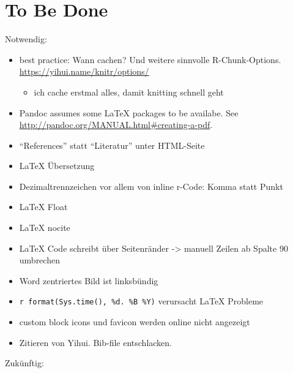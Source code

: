\documentclass[]{book}
\providecommand{\tightlist}{%
  \setlength{\itemsep}{0pt}\setlength{\parskip}{0pt}}
\theoremstyle{definition}
\theoremstyle{definition}
\theoremstyle{remark}
\begin{document}
\hypertarget{tbd}{\chapter{To Be Done}\label{tbd}}

Notwendig:

\begin{itemize}
\tightlist
\item
  best practice: Wann cachen? Und weitere sinnvolle R-Chunk-Options.
  \url{https://yihui.name/knitr/options/}

  \begin{itemize}
  \tightlist
  \item
    ich cache erstmal alles, damit knitting schnell geht
  \end{itemize}
\item
  Pandoc assumes some LaTeX packages to be availabe. See
  \url{http://pandoc.org/MANUAL.html\#creating-a-pdf}.
\item
  ``References'' statt ``Literatur'' unter HTML-Seite
\item
  LaTeX Übersetzung
\item
  Dezimaltrennzeichen vor allem von inline r-Code: Komma statt Punkt
\item
  LaTeX Float
\item
  LaTeX nocite
\item
  LaTeX Code schreibt über Seitenränder -\textgreater{} manuell Zeilen
  ab Spalte 90 umbrechen
\item
  Word zentriertes Bild ist linksbündig
\item
  \texttt{\textquotesingle{}r\ format(Sys.time(),\ \textquotesingle{}\%d.\ \%B\ \%Y\textquotesingle{})\textquotesingle{}}
  verursacht LaTeX Probleme
\item
  custom block icons und favicon werden online nicht angezeigt
\item
  Zitieren von Yihui. Bib-file entschlacken.
\end{itemize}

Zukünftig:
\end{document}
